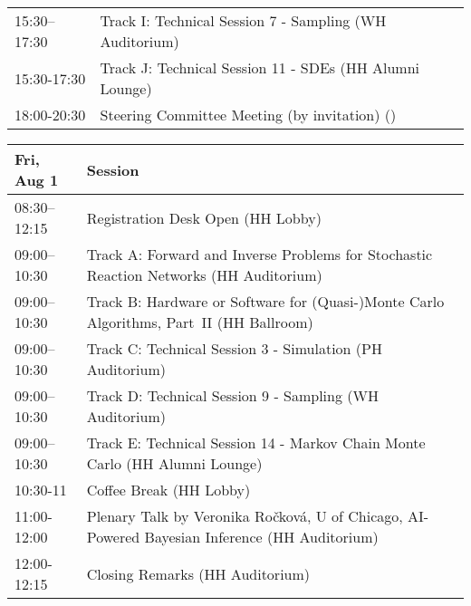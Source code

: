 \begin{table}
{\begin{tabularx}{\textwidth}{>{\hsize=0.32\hsize}X|>{\hsize=1.7\hsize}X}
\cellcolor{\SessionLightColor}15:30–17:30 & \cellcolor{\SessionLightColor}Track I: Technical Session 7 - Sampling (WH Auditorium) \\
\cellcolor{\SessionLightColor}15:30-17:30 & \cellcolor{\SessionLightColor}Track J: Technical Session 11 - SDEs (HH Alumni Lounge) \\
\cellcolor{\SessionTitleColor}18:00-20:30 & \cellcolor{\SessionTitleColor}Steering Committee Meeting (by invitation) () \\
\hline
\end{tabularx}
}
\end{table}

\begin{table}
{\footnotesize
\begin{tabularx}{\textwidth}{>{\hsize=0.32\hsize}X|>{\hsize=1.7\hsize}X}
\hline
\textbf{Fri, Aug 1} & \textbf{Session} \\
\hline
\cellcolor{\EmptyColor}08:30–12:15 & \cellcolor{\EmptyColor}Registration Desk Open (HH Lobby) \\
\cellcolor{\SessionTitleColor}09:00–10:30 & \cellcolor{\SessionTitleColor}Track A: Forward and Inverse Problems for Stochastic Reaction Networks (HH Auditorium) \\
\cellcolor{\SessionTitleColor}09:00–10:30 & \cellcolor{\SessionTitleColor}Track B: Hardware or Software for (Quasi-)Monte Carlo Algorithms, Part~II (HH Ballroom) \\
\cellcolor{\SessionLightColor}09:00–10:30 & \cellcolor{\SessionLightColor}Track C: Technical Session 3 - Simulation (PH Auditorium) \\
\cellcolor{\SessionLightColor}09:00–10:30 & \cellcolor{\SessionLightColor}Track D: Technical Session 9 - Sampling (WH Auditorium) \\
\cellcolor{\SessionLightColor}09:00–10:30 & \cellcolor{\SessionLightColor}Track E: Technical Session 14 - Markov Chain Monte Carlo (HH Alumni Lounge) \\
\cellcolor{\EmptyColor}10:30-11 & \cellcolor{\EmptyColor}Coffee Break (HH Lobby) \\
\cellcolor{\PlenaryColor}11:00-12:00 & \cellcolor{\PlenaryColor}Plenary Talk by Veronika Ročková, U of Chicago, AI-Powered Bayesian Inference (HH Auditorium) \\
\cellcolor{\PlenaryColor}12:00-12:15 & \cellcolor{\PlenaryColor}Closing Remarks (HH Auditorium) \\
\hline
\end{tabularx}
}
\end{table}

